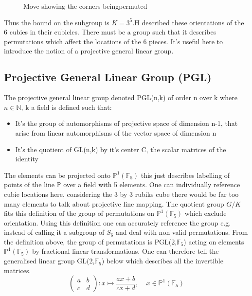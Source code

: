 \documentclass{article}
\newcounter{lem}[section]\setcounter{lem}{0}
\begin{document}
\begin{figure}[h]
\centering
  \TwoCubeSolved%
  \changecornerarrow
  \TwoRotation{\changecorner}
  \caption{Move showing the corners beingpermuted}
\end{figure}
Thus the bound on the subgroup is $K = 3^5$.\newline H described these orientations of the 6 cubies in their cubicles. There must be a group such that it describes permutations which affect the locations of the 6 pieces.
It's useful here to introduce the notion of a projective general linear group. 

\subsection*{Projective General Linear Group (PGL)}
The projective general linear group denoted PGL(n,k) of order n over k where $n \in \mathbb{N}$, k a field is defined such that:
\begin{itemize}
\item It's the group of automorphisms of projective space of dimension n-1, that arise from linear automorphisms of the vector space of dimension n
\item It's the quotient of GL(n,k) by it's center C, the scalar matrices of the identity
\end{itemize} 

The elements can be projected onto $\mathbb{P}^{1}(\mathbb{F}_5)$ this just describes labelling of points of the line $\mathbb{P}$ over a field with 5 elements. One can individually reference cubie locations here, considering the 3 by 3 rubiks cube there would be far too many elements to talk about projective line mapping. The quotient group $G/K$ fits this definition of the group of permutations on $\mathbb{P}^{1}(\mathbb{F}_5)$ which exclude orientation. Using this definition one can accurately reference the group e.g. instead of calling it a subgroup of $S_6$ and deal with non valid permutations. From the definition above, the group of permutations is PGL(2,$\mathbb{F}_5$) acting on elements $\mathbb{P}^{1}(\mathbb{F}_5)$ by fractional linear  transformations. One can therefore tell the generalised linear group GL(2,$\mathbb{F}_5$) below which describes all the invertible matrices.
\begin{equation}
\begin{pmatrix} a & b \\ c & d \end{pmatrix} : x \mapsto \frac{ax + b}{cx + d},\ \ \ \ \ x \in \mathbb{P}^{1}(\mathbb{F}_5)
\end{equation}
\end{document}
